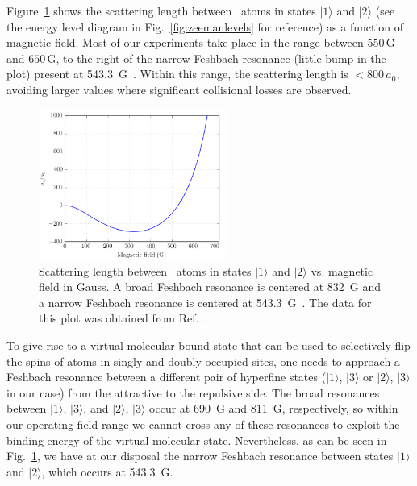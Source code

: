 Figure~\ref{fig:ajochim} shows the scattering length between \li\ atoms in
states $|1\rangle$ and $|2\rangle$ (see the energy level diagram in
Fig.~\ref{fig:zeemanlevels} for reference) as a function of magnetic field.
Most of our experiments take place in the range between $550\,$G and $650\,$G,
to the right of the narrow Feshbach resonance (little bump in the plot) present
at 543.3~G~\cite{Strecker2003,Hazlett2012}.   Within this range, the scattering
length is $<800\,a_{0}$, avoiding larger values where  significant collisional
losses are observed.
\begin{figure}
\centering
\includegraphics[width=0.55\textwidth]{../figures/double_occ/ajochim_plot.png}
\caption[\li\ scattering length vs. magnetic field]{Scattering length between
\li\ atoms in states $|1\rangle$ and $|2\rangle$ vs. magnetic field in Gauss.
A broad Feshbach resonance is centered at 832~G and a narrow Feshbach resonance
is centered at 543.3~G~\cite{Strecker2003,Hazlett2012}.  The data for this plot
was obtained from Ref.~\cite{Zurn2013}.}
\label{fig:ajochim}
\end{figure}


To give rise to a virtual molecular bound state that can be used to selectively
flip the spins of atoms in singly and doubly occupied sites, one needs to
approach a Feshbach resonance between a different pair of hyperfine states
($|1\rangle$, $|3\rangle$ or $|2\rangle$, $|3\rangle$ in our case)  from the
attractive to the repulsive side.   The broad resonances between $|1\rangle$,
$|3\rangle$, and $|2\rangle$, $|3\rangle$ occur at 690~G and 811~G,
respectively, so within our operating field range we cannot cross any of these
resonances to exploit the binding energy of the virtual molecular state.
Nevertheless, as can be seen in Fig.~\ref{fig:ajochim}, we have at our disposal
the narrow Feshbach resonance between states $|1\rangle$ and $|2\rangle$, which
occurs at 543.3~G.  

